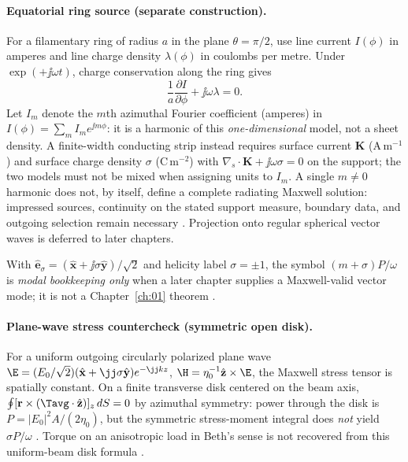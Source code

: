 \paragraph{Equatorial ring source (separate construction).}
For a filamentary ring of radius $a$ in the plane $\theta=\pi/2$, use line current $I(\phi)$ in amperes and line charge density $\lambda(\phi)$ in coulombs per metre. Under $\exp(+\jj\omega t)$, charge conservation along the ring gives
\[
\frac{1}{a}\frac{\partial I}{\partial\phi}+\jj\omega\lambda=0.
\]
Let $I_m$ denote the $m$th azimuthal Fourier coefficient (amperes) in $I(\phi)=\sum_m I_m e^{\jj m\phi}$: it is a harmonic of this \emph{one-dimensional} model, not a sheet density. A finite-width conducting strip instead requires surface current $\mathbf K$ (A\,m$^{-1}$) and surface charge density $\sigma$ (C\,m$^{-2}$) with $\nabla_s\cdot\mathbf K+\jj\omega\sigma=0$ on the support; the two models must not be mixed when assigning units to $I_m$. A single $m\neq0$ harmonic does not, by itself, define a complete radiating Maxwell solution: impressed sources, continuity on the stated support measure, boundary data, and outgoing selection remain necessary \cite{stratton1941,tai1994}. Projection onto regular spherical vector waves is deferred to later chapters.
\begin{remark}[Modal $M=m+\sigma$ bookkeeping only]
\label{rem:ch1.m-plus-sigma}
With $\hat{\mathbf{e}}_\sigma=(\hat{\mathbf{x}}+\jj\sigma\hat{\mathbf{y}})/\sqrt{2}$ and helicity label $\sigma=\pm1$, the symbol $(m+\sigma)P/\omega$ is \emph{modal bookkeeping only} when a later chapter supplies a Maxwell-valid vector mode; it is not a Chapter~\ref{ch:01} theorem \cite{allen1992,cerjan2011,monteiro2009}.
\end{remark}

\paragraph{Plane-wave stress countercheck (symmetric open disk).}
For a uniform outgoing circularly polarized plane wave $\E=(E_0/\sqrt{2})(\hat{\mathbf{x}}+\jj\sigma\hat{\mathbf{y}})e^{-\jj kz}$, $\H=\eta_0^{-1}\hat{\mathbf{z}}\times\E$, the Maxwell stress tensor is spatially constant. On a finite transverse disk centered on the beam axis, $\oint[\mathbf{r}\times(\Tavg\cdot\hat{\mathbf{z}})]_z\,dS=0$ by azimuthal symmetry: power through the disk is $P=|E_0|^2 A/(2\eta_0)$, but the symmetric stress-moment integral does \emph{not} yield $\sigma P/\omega$ \cite{stratton1941,beth1936,stewart2005}. Torque on an anisotropic load in Beth's sense \cite{beth1936} is not recovered from this uniform-beam disk formula \cite{beth1936,stratton1941}.

